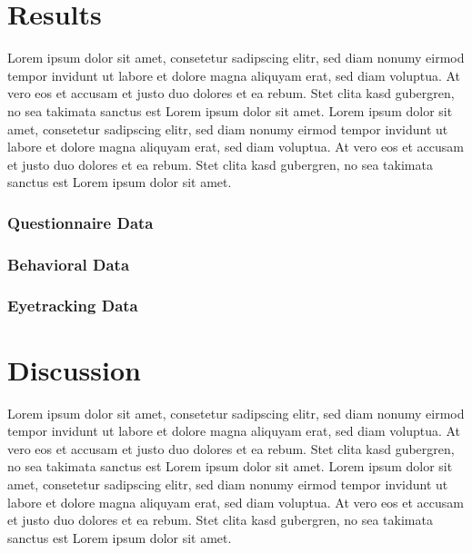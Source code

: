 \documentclass[
  english,
  man,floatsintext]{apa6}
\begin{document}
\hypertarget{results}{%
\section{Results}\label{results}}

Lorem ipsum dolor sit amet, consetetur sadipscing elitr, sed diam nonumy eirmod tempor invidunt ut labore et dolore magna aliquyam erat, sed diam voluptua. At vero eos et accusam et justo duo dolores et ea rebum. Stet clita kasd gubergren, no sea takimata sanctus est Lorem ipsum dolor sit amet. Lorem ipsum dolor sit amet, consetetur sadipscing elitr, sed diam nonumy eirmod tempor invidunt ut labore et dolore magna aliquyam erat, sed diam voluptua. At vero eos et accusam et justo duo dolores et ea rebum. Stet clita kasd gubergren, no sea takimata sanctus est Lorem ipsum dolor sit amet.

\hypertarget{questionnaire-data-1}{%
\subsubsection{Questionnaire Data}\label{questionnaire-data-1}}

\hypertarget{behavioral-data-1}{%
\subsubsection{Behavioral Data}\label{behavioral-data-1}}

\hypertarget{eyetracking-data-3}{%
\subsubsection{Eyetracking Data}\label{eyetracking-data-3}}

\hypertarget{discussion}{%
\section{Discussion}\label{discussion}}

Lorem ipsum dolor sit amet, consetetur sadipscing elitr, sed diam nonumy eirmod tempor invidunt ut labore et dolore magna aliquyam erat, sed diam voluptua. At vero eos et accusam et justo duo dolores et ea rebum. Stet clita kasd gubergren, no sea takimata sanctus est Lorem ipsum dolor sit amet. Lorem ipsum dolor sit amet, consetetur sadipscing elitr, sed diam nonumy eirmod tempor invidunt ut labore et dolore magna aliquyam erat, sed diam voluptua. At vero eos et accusam et justo duo dolores et ea rebum. Stet clita kasd gubergren, no sea takimata sanctus est Lorem ipsum dolor sit amet.
\end{document}
